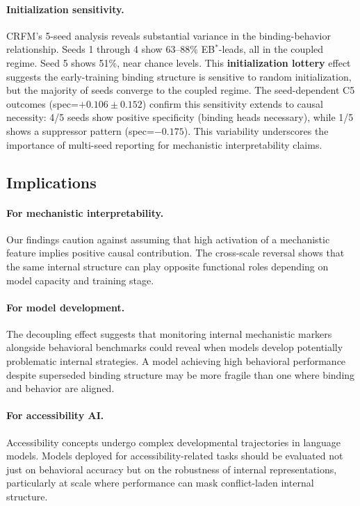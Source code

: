 \documentclass[10pt]{article} %
\begin{document}
\paragraph{Initialization sensitivity.}
CRFM's 5-seed analysis reveals substantial variance in the binding-behavior relationship. Seeds 1 through 4 show 63--88\% EB$^*$-leads, all in the coupled regime. Seed 5 shows 51\%, near chance levels.
This \textbf{initialization lottery} effect suggests the early-training binding structure is sensitive to random initialization, but the majority of seeds converge to the coupled regime.
The seed-dependent C5 outcomes (spec=$+0.106\pm0.152$) confirm this sensitivity extends to causal necessity: 4/5 seeds show positive specificity (binding heads necessary), while 1/5 shows a suppressor pattern (spec=$-0.175$).
This variability underscores the importance of multi-seed reporting for mechanistic interpretability claims.

\subsection{Implications}

\paragraph{For mechanistic interpretability.}
Our findings caution against assuming that high activation of a mechanistic feature implies positive causal contribution.
The cross-scale reversal shows that the same internal structure can play opposite functional roles depending on model capacity and training stage.

\paragraph{For model development.}
The decoupling effect suggests that monitoring internal mechanistic markers alongside behavioral benchmarks could reveal when models develop potentially problematic internal strategies.
A model achieving high behavioral performance despite superseded binding structure may be more fragile than one where binding and behavior are aligned.

\paragraph{For accessibility AI.}
Accessibility concepts undergo complex developmental trajectories in language models.
Models deployed for accessibility-related tasks should be evaluated not just on behavioral accuracy but on the robustness of internal representations, particularly at scale where performance can mask conflict-laden internal structure.
\end{document}
